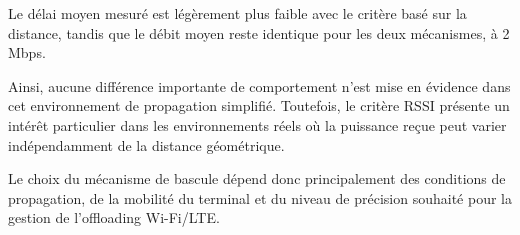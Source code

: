 Le délai moyen mesuré est légèrement plus faible avec
le critère basé sur la distance, tandis que le débit
moyen reste identique pour les deux mécanismes,
à 2 Mbps.

Ainsi, aucune différence importante de comportement
n'est mise en évidence dans cet environnement de
propagation simplifié. Toutefois, le critère RSSI
présente un intérêt particulier dans les environnements
réels où la puissance reçue peut varier indépendamment
de la distance géométrique.

Le choix du mécanisme de bascule dépend donc principalement
des conditions de propagation, de la mobilité du terminal
et du niveau de précision souhaité pour la gestion de
l'offloading Wi-Fi/LTE.
